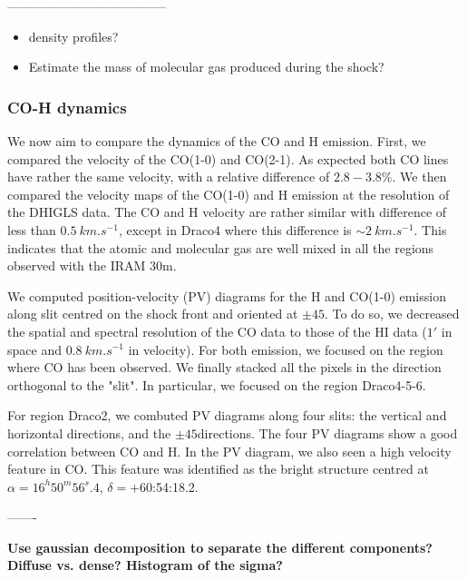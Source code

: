 \documentclass[traditabstract]{aa}
\begin{document}
--------------------------------------

\begin{itemize}
  \item density profiles?
  \item Estimate the mass of molecular gas produced during the shock?
\end{itemize}


      \subsubsection{CO-H dynamics}

   We now aim to compare the dynamics of the CO and H emission. First, we compared the velocity of the CO(1-0) and CO(2-1). As expected both CO lines have rather the same velocity, with a relative difference of $2.8-3.8\%$. We then compared the velocity maps of the CO(1-0) and H emission at the resolution of the DHIGLS data. The CO and H velocity are rather similar with difference of less than $0.5\: km.s^{-1}$, except in Draco4 where this difference is $\sim 2\: km.s^{-1}$. This indicates that the atomic and molecular gas are well mixed in all the regions observed with the IRAM 30m.

   We computed position-velocity (PV) diagrams for the H and CO(1-0) emission along slit centred on the shock front and oriented at $\pm 45$\degree. To do so, we decreased the spatial and spectral resolution of the CO data to those of the HI data ($1'$ in space and $0.8\: km.s^{-1}$ in velocity). For both emission, we focused on the region where CO has been observed. We finally stacked all the pixels in the direction orthogonal to the "slit".%
In particular, we focused on the region Draco4-5-6. 

   For region Draco2, we combuted PV diagrams along four slits: the vertical and horizontal directions, and the $\pm 45$\degree directions. The four PV diagrams show a good correlation between CO and H. In the PV diagram, we also seen a high velocity feature in CO. This feature was identified as the bright structure centred at $\alpha=16^h 50^m 56^s.4$, $\delta=+$60:54:18.2.

-------

\textbf{Use gaussian decomposition to separate the different components? Diffuse vs. dense? Histogram of the sigma?}


\end{document}
